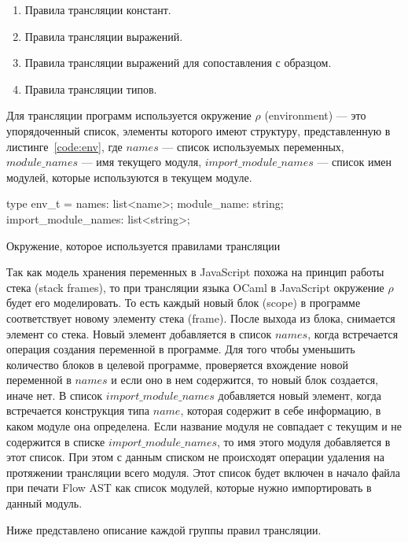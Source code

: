 \documentclass[12pt]{matmex-diploma}
\begin{document}
\begin{enumerate}
\item Правила трансляции констант.
\item Правила трансляции выражений.
\item Правила трансляции выражений для сопоставления с образцом.
\item Правила трансляции типов.
\end{enumerate}

Для трансляции программ используется окружение $\rho$ (environment) --- это упорядоченный список, элементы которого имеют структуру, представленную в листинге~\ref{code:env}, где $names$ --- список используемых переменных, $module\_names$ --- имя текущего модуля, $import\_module\_names$ --- список имен модулей, которые используются в текущем модуле. 

\begin{listing}
\begin{pyglist}[language=ocaml,numbers=none,numbersep=5pt, fontsize=\small]
type env_t = {
  names: list<name>;
  module_name: string;
  import_module_names: list<string>;
}
\end{pyglist}
\caption{Окружение, которое используется правилами трансляции}
\label{code:env}
\end{listing}

Так как модель хранения переменных в JavaScript похожа на принцип работы стека (stack frames), то при трансляции языка OCaml в JavaScript окружение $\rho$ будет его моделировать. То есть каждый новый блок (scope) в программе соответствует новому элементу стека (frame). После выхода из блока, снимается элемент со стека. Новый элемент добавляется в список $names$, когда встречается операция создания переменной в программе. Для того чтобы уменьшить количество блоков в целевой программе, проверяется вхождение новой переменной в $names$ и если оно в нем содержится, то новый блок создается, иначе нет. В список $import\_module\_names$ добавляется новый элемент, когда встречается конструкция типа $name$, которая содержит в себе информацию, в каком модуле она определена. Если название модуля не совпадает с текущим и не содержится в списке $import\_module\_names$, то имя этого модуля добавляется в этот список. При этом с данным списком не происходят операции удаления на протяжении трансляции всего модуля. Этот список будет включен в начало файла при печати Flow AST как список модулей, которые нужно импортировать в данный модуль. 

Ниже представлено описание каждой группы правил трансляции. 
\end{document}
